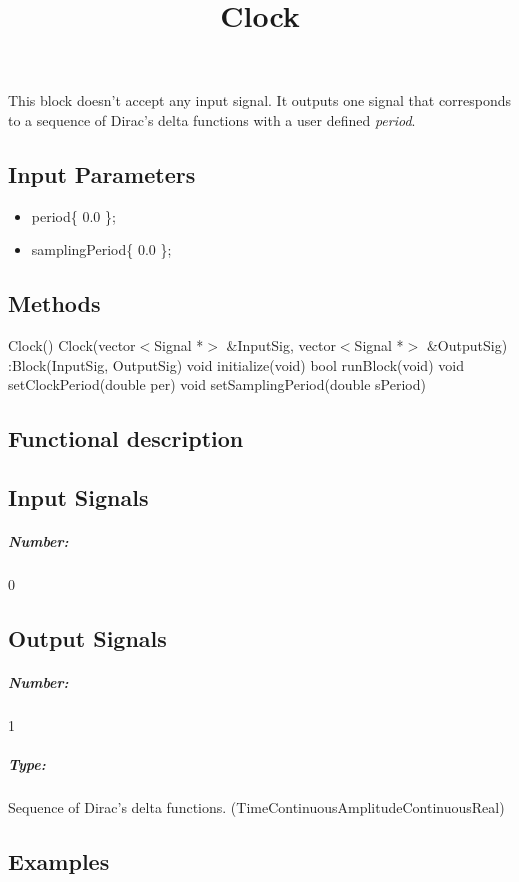 \documentclass[a4paper]{article}
\title{Clock}
\begin{document}
\maketitle

This block doesn't accept any input signal. It outputs one signal that corresponds to a sequence of Dirac's delta functions with a user defined \textit{period}.

\subsection*{Input Parameters}

\begin{itemize}
	\item period\{ 0.0 \};
	\item samplingPeriod\{ 0.0 \};
\end{itemize}

\subsection*{Methods}
 
Clock() {}
\bigbreak
Clock(vector$<$Signal *$>$ \&InputSig, vector$<$Signal *$>$ \&OutputSig) :Block(InputSig, OutputSig) {}
\bigbreak
void initialize(void)
\bigbreak
bool runBlock(void)
\bigbreak
void setClockPeriod(double per)
\bigbreak
void setSamplingPeriod(double sPeriod)
\subsection*{Functional description}


\pagebreak

\subsection*{Input Signals}

\subparagraph*{Number:} 0

\subsection*{Output Signals}

\subparagraph*{Number:} 1

\subparagraph*{Type:} Sequence of Dirac's delta functions. (TimeContinuousAmplitudeContinuousReal)

\subsection*{Examples} 
\end{document}

